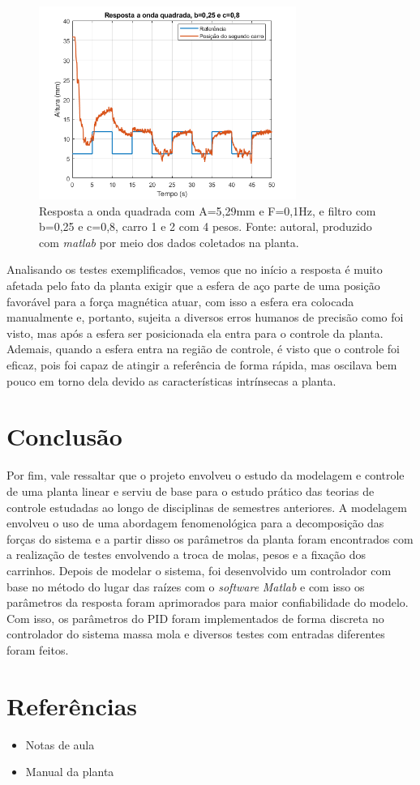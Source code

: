 \documentclass{ifacconf}
\begin{document}
\begin{figure}[!htb]
  \begin{center}
  \includegraphics[width=8.4cm]{figures/resultado_teste5.png}    %
  \caption{Resposta a onda quadrada com A=5,29mm e F=0,1Hz, e filtro com b=0,25 e c=0,8, carro 1 e 2 com 4 pesos. Fonte: autoral, produzido com \textit{matlab} por meio dos dados coletados na planta.} 
  \label{fig:teste5}
  \end{center}
\end{figure}

Analisando os testes exemplificados, vemos que no início a resposta é muito afetada pelo fato da planta exigir que a esfera de aço parte de uma posição favorável para a força magnética atuar, com isso a esfera 
era colocada manualmente e, portanto, sujeita a diversos erros humanos de precisão como foi visto, mas após a esfera ser posicionada ela entra para o controle da planta.
Ademais, quando a esfera entra na região de controle, é visto que o controle foi eficaz, pois foi capaz de atingir a referência de forma rápida, mas oscilava bem pouco em torno dela devido as características
intrínsecas a planta. 

\section{Conclusão}

Por fim, vale ressaltar que o projeto envolveu o estudo da modelagem e controle de uma planta linear e serviu de base para o estudo prático das teorias de controle estudadas ao longo de disciplinas de semestres anteriores. A modelagem envolveu o uso de uma abordagem fenomenológica para a decomposição das forças do sistema e a partir disso os parâmetros da planta foram encontrados com a realização de testes envolvendo a troca de molas, pesos e a fixação dos carrinhos. Depois de modelar o sistema, foi desenvolvido um controlador com base no método do lugar das raízes com o \textit{software} \textit{Matlab} e com isso os parâmetros da resposta foram aprimorados para maior confiabilidade do modelo. Com isso, os parâmetros do PID foram implementados de forma discreta no controlador do sistema massa mola e diversos testes com entradas diferentes foram feitos.  

\section{Referências}

\begin{itemize}
  \item Notas de aula
  \item Manual da planta
\end{itemize}
\end{document}
